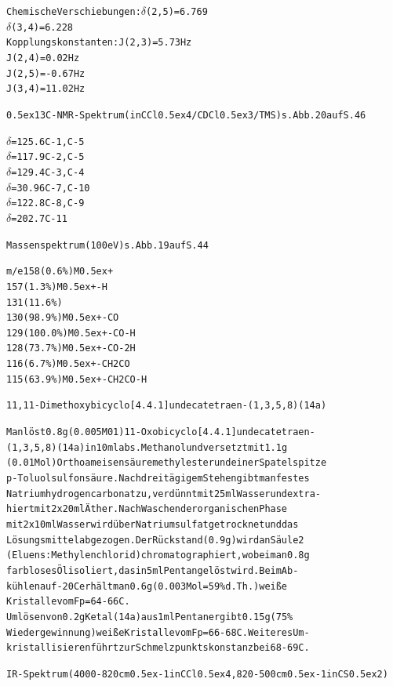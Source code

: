 \documentclass[a4paper,11pt]{article}
\begin{document}
\begin{alltt}

Chemische Verschiebungen:   \(\delta\)(2,5) = 6.769
                            \(\delta\)(3,4) = 6.228
Kopplungskonstanten:        J(2,3) =  5.73 Hz
                            J(2,4) =  0.02 Hz
                            J(2,5) = -0.67 Hz
                            J(3,4) = 11.02 Hz

\leavevmode\raise0.5ex\hbox{13}C-NMR-Spektrum (in CCl\lower0.5ex\hbox{4}/CDCl\lower0.5ex\hbox{3}/TMS) s. Abb. 20 auf S. 46

          \(\delta\) = 125.6         C-1, C-5
          \(\delta\) = 117.9         C-2, C-5
          \(\delta\) = 129.4         C-3, C-4
          \(\delta\) =  30.96        C-7, C-10
          \(\delta\) = 122.8         C-8, C-9
          \(\delta\) = 202.7         C-11

Massenspektrum (100 eV) s. Abb. 19 auf S. 44

m/e       158   (0.6 \%)     M\raise0.5ex\hbox{+}
          157   (1.3 \%)     M\raise0.5ex\hbox{+} - H
          131  (11.6 \%)
          130  (98.9 \%)     M\raise0.5ex\hbox{+} - CO
          129 (100.0 \%)     M\raise0.5ex\hbox{+} - CO - H
          128  (73.7 \%)     M\raise0.5ex\hbox{+} - CO - 2 H
          116   (6.7 \%)     M\raise0.5ex\hbox{+} - CH2CO
          115  (63.9 \%)     M\raise0.5ex\hbox{+} - CH2CO - H

\newpage
{}


11,11-Dimethoxybicyclo[4.4.1]undecatetraen-(1‚3,5,8) (14a)

Man löst 0.8 g (0.005 M01) 11-Oxobicyclo[4.4.1]undecatetraen-
(1,3,5,8) (14a) in 10 ml abs. Methanol und versetzt mit 1.1 g
(0.01 Mol) Orthoameisensäuremethylester und einer Spatelspitze
p-Toluolsulfonsäure. Nach dreitägigem Stehen gibt man festes
Natriumhydrogencarbonat zu, verdünnt mit 25 ml Wasser und extra-
hiert mit 2 x 20 ml Äther. Nach Waschen der organischen Phase
mit 2 x 10 ml Wasser wird über Natriumsulfat getrocknet und das
Lösungsmittel abgezogen. Der Rückstand (0.9 g) wird an Säule 2
(Eluens: Methylenchlorid) chromatographiert, wobei man 0.8 g
farbloses Öl isoliert, das in 5 ml Pentan gelöst wird. Beim Ab-
kühlen auf -20\degree{}C erhält man 0.6 g (0.003 Mol = 59 \% d.Th.) weiße
Kristalle vom Fp = 64 - 66\degree{}C.
Umlösen von 0.2 g Ketal (14a) aus 1 ml Pentan ergibt 0.15 g (75 \%
Wiedergewinnung) weiße Kristalle vom Fp = 66 - 68\degree{}C. Weiteres Um-
kristallisieren führt zur Schmelzpunktskonstanz bei 68 - 69\degree{}C.


IR-Spektrum (4000-820 cm\raise0.5ex\hbox{-1} in CCl\lower0.5ex\hbox{4}, 820-500 cm\raise0.5ex\hbox{-1} in CS\lower0.5ex\hbox{2})
\end{alltt}
\end{document}
